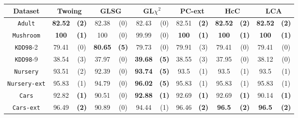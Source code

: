 \begin{table}
\small
\centering
\begin{tabular}{c|cc|cc|cc|cc|cc|cc} 
Dataset             & \multicolumn{2}{c|}{Twoing} &  \multicolumn{2}{c|}{GLSG}  & \multicolumn{2}{c|}{GL$\chi^2$} & \multicolumn{2}{c|}{PC-ext}& \multicolumn{2}{c|}{HcC}& \multicolumn{2}{c}{LCA}\\
\hline
{\tt Adult}         &  {\bf 82.52} & {\bf (2)}    &  82.38       & (0)          &  82.43       & (0)              & 82.51      & {\bf (2)}    & {\bf 82.52}& {\bf (2)}  & {\bf 82.52}& {\bf (2)}  \\
{\tt Mushroom}      &  {\bf 100}   & {\bf (1)}    &  100         & (0)          &  99.99       & (0)              & {\bf 100 } & {\bf (1)}    & {\bf 100}  & {\bf (1)}  & {\bf 100}  & {\bf (1)}  \\
{\tt KDD98}-2       &  79.41       & (0)          &  {\bf 80.65} & {\bf (5)}    &  79.73       & (0)              & 79.91      & (3)          & 79.41      & (0)        & 79.41      & (0)        \\
{\tt KDD98}-9       &  38.54       & (3)          &  37.97       & (0)          &  {\bf 39.68} & {\bf (5)}        & 38.55      & (3)          & 37.95      & (0)        & 38.12      & (0)        \\
{\tt Nursery}       &  93.51       & (2)          &  92.39       & (0)          &  {\bf 93.74} & {\bf (5)}        & 93.5       & (1)          & 93.5       & (1)        & 93.5       & (1)        \\
{\tt Nursery-ext}   &  95.83       & (1)          &  94.79       & (0)          &  {\bf 96.02} & {\bf (5)}        & 95.83      & (1)          & 95.83      & (1)        & 95.83      & (1)        \\
{\tt Cars}          &  92.82       & {\bf (1)}    &  90.51       & (0)          &  {\bf 92.88} & {\bf (1)}        & 92.69      & {\bf (1)}    & 92.69      & {\bf (1)}  & 90.14      & {\bf (1)}  \\
{\tt Cars-ext}      &  96.49       & {\bf (2)}    &  90.89       & (0)          &  94.44       & (1)              & 96.46      & {\bf (2)}    & {\bf 96.5} & {\bf (2)}  & {\bf 96.5} & {\bf (2)}  \\

\end{tabular}
\end{table}
